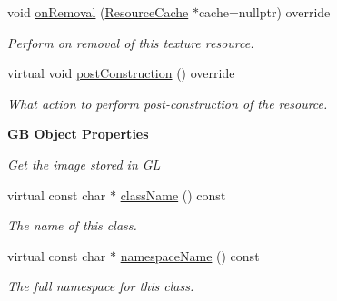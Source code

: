 \begin{Indent}
\begin{DoxyCompactItemize}
\mbox{\label{classrev_1_1_texture_a261764c4bae8414425818e0ef8d50c71}} 
void \mbox{\hyperlink{classrev_1_1_texture_a261764c4bae8414425818e0ef8d50c71}{on\+Removal}} (\mbox{\hyperlink{classrev_1_1_resource_cache}{Resource\+Cache}} $\ast$cache=nullptr) override
\begin{DoxyCompactList}\small\item\em Perform on removal of this texture resource. \end{DoxyCompactList}\item 
virtual void \mbox{\hyperlink{classrev_1_1_texture_aaa505679ad69f466e6aa9027e0419684}{post\+Construction}} () override
\begin{DoxyCompactList}\small\item\em What action to perform post-\/construction of the resource. \end{DoxyCompactList}\end{DoxyCompactItemize}
\end{Indent}
\begin{Indent}\textbf{ GB Object Properties}\par
{\em Get the image stored in GL }\begin{DoxyCompactItemize}
\item 
virtual const char $\ast$ \mbox{\hyperlink{classrev_1_1_texture_a7f05304af91d3ea7ab923c43d9ad75d1}{class\+Name}} () const
\begin{DoxyCompactList}\small\item\em The name of this class. \end{DoxyCompactList}\item 
virtual const char $\ast$ \mbox{\hyperlink{classrev_1_1_texture_ad26e3169ee1055c346487f0db2f4ce94}{namespace\+Name}} () const
\begin{DoxyCompactList}\small\item\em The full namespace for this class. \end{DoxyCompactList}\end{DoxyCompactItemize}
\end{Indent}
